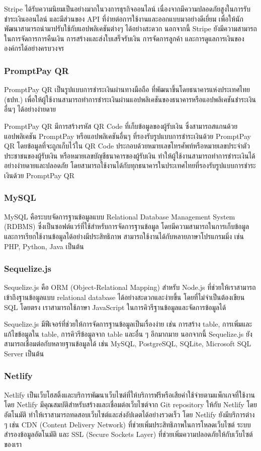 Stripe ได้รับความนิยมเป็นอย่างมากในวงการธุรกิจออนไลน์ เนื่องจากมีความปลอดภัยสูงในการรับชำระเงินออนไลน์ และมีส่วนของ API ที่ง่ายต่อการใช้งานและออกแบบมาอย่างดีเยี่ยม เพื่อให้นักพัฒนาสามารถนำมาปรับใช้กับแอปพลิเคชันต่างๆ ได้อย่างสะดวก นอกจากนี้ Stripe ยังมีความสามารถในการจัดการการคืนเงิน การสร้างและส่งใบเสร็จรับเงิน การจัดการลูกค้า และการดูแลการเงินขององค์กรได้อย่างครบวงจร
\subsubsection{PromptPay QR~\cite{promptpay}}
PromptPay QR เป็นรูปแบบการชำระเงินผ่านทางมือถือ ที่พัฒนาขึ้นโดยธนาคารแห่งประเทศไทย (ธปท.) เพื่อให้ผู้ใช้งานสามารถทำการชำระเงินผ่านแอปพลิเคชันของธนาคารหรือแอปพลิเคชันชำระเงินอื่นๆ ได้อย่างง่ายดาย

PromptPay QR มีการสร้างรหัส QR Code ที่เก็บข้อมูลของผู้รับเงิน ซึ่งสามารถสแกนด้วยแอปพลิเคชัน PromptPay หรือแอปพลิเคชันอื่นๆ ที่รองรับรูปแบบการชำระเงินด้วย PromptPay QR โดยข้อมูลที่จะถูกเก็บไว้ใน QR Code ประกอบด้วยหมายเลขโทรศัพท์หรือหมายเลขประจำตัวประชาชนของผู้รับเงิน หรือหมายเลขบัญชีธนาคารของผู้รับเงิน ทำให้ผู้ใช้งานสามารถทำการชำระเงินได้อย่างง่ายดายและปลอดภัย โดยสามารถใช้งานได้กับทุกธนาคารในประเทศไทยที่รองรับรูปแบบการชำระเงินด้วย PromptPay QR
\subsubsection{MySQL~\cite{mysql}}
MySQL คือระบบจัดการฐานข้อมูลแบบ Relational Database Management System (RDBMS) ซึ่งเป็นซอฟต์แวร์ที่ใช้สำหรับการจัดการฐานข้อมูล โดยมีความสามารถในการเก็บข้อมูลและการเรียกใช้งานข้อมูลได้อย่างมีประสิทธิภาพ สามารถใช้งานได้กับหลายภาษาโปรแกรมมิ่ง เช่น PHP, Python, Java เป็นต้น
\subsubsection{Sequelize.js~\cite{sequelize}}
Sequelize.js คือ ORM (Object-Relational Mapping) สำหรับ Node.js ที่ช่วยให้เราสามารถเข้าถึงฐานข้อมูลแบบ relational database ได้อย่างสะดวกและง่ายขึ้น โดยที่ไม่จำเป็นต้องเขียน SQL โดยตรง เราสามารถใช้ภาษา JavaScript ในการคิวรีฐานข้อมูลและจัดการข้อมูลได้

Sequelize.js มีฟีเจอร์ที่ช่วยให้การจัดการฐานข้อมูลเป็นเรื่องง่าย เช่น การสร้าง table, การเพิ่มและแก้ไขข้อมูลใน table, การคิวรีข้อมูลจาก table และอื่น ๆ อีกมากมาย นอกจากนี้ Sequelize.js ยังสามารถเชื่อมต่อกับหลายฐานข้อมูลได้ เช่น MySQL, PostgreSQL, SQLite, Microsoft SQL Server เป็นต้น
\subsubsection{Netlify~\cite{netlify}}
Netlify เป็นเว็บโฮสติ้งและบริการพัฒนาเว็บไซต์ที่ให้บริการฟรีหรือเสียค่าใช้จ่ายตามแพ็กเกจที่ใช้งาน โดย Netlify มีคุณสมบัติสำหรับสร้างและเชื่อมต่อเว็บไซต์จาก Git repository ให้กับ Netlify โดยอัตโนมัติ ทำให้เราสามารถทดสอบเว็บไซต์และส่งอัปเดตได้อย่างรวดเร็ว โดย Netlify ยังมีบริการต่าง ๆ เช่น CDN (Content Delivery Network) ที่ช่วยเพิ่มประสิทธิภาพในการโหลดเว็บไซต์ ระบบสำรองข้อมูลอัตโนมัติ และ SSL (Secure Sockets Layer) ที่ช่วยเพิ่มความปลอดภัยให้กับเว็บไซต์ของเรา
